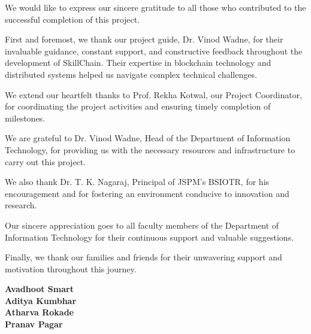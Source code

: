 We would like to express our sincere gratitude to all those who contributed to the successful completion of this project.

First and foremost, we thank our project guide, Dr. Vinod Wadne, for their invaluable guidance, constant support, and constructive feedback throughout the development of SkillChain. Their expertise in blockchain technology and distributed systems helped us navigate complex technical challenges.

We extend our heartfelt thanks to Prof. Rekha Kotwal, our Project Coordinator, for coordinating the project activities and ensuring timely completion of milestones.

We are grateful to Dr. Vinod Wadne, Head of the Department of Information Technology, for providing us with the necessary resources and infrastructure to carry out this project.

We also thank Dr. T. K. Nagaraj, Principal of JSPM's BSIOTR, for his encouragement and for fostering an environment conducive to innovation and research.

Our sincere appreciation goes to all faculty members of the Department of Information Technology for their continuous support and valuable suggestions.

Finally, we thank our families and friends for their unwavering support and motivation throughout this journey.

\vspace{1cm}

\begin{flushright}
\textbf{Avadhoot Smart}\\
\textbf{Aditya Kumbhar}\\
\textbf{Atharva Rokade}\\
\textbf{Pranav Pagar}
\end{flushright}